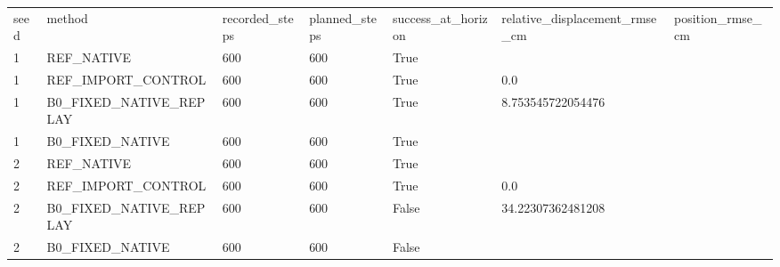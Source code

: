 \begin{tabular}{lllllll}
seed & method & recorded\_steps & planned\_steps & success\_at\_horizon & relative\_displacement\_rmse\_cm & position\_rmse\_cm \\
1 & REF\_NATIVE & 600 & 600 & True &  &  \\
1 & REF\_IMPORT\_CONTROL & 600 & 600 & True & 0.0 &  \\
1 & B0\_FIXED\_NATIVE\_REPLAY & 600 & 600 & True & 8.753545722054476 &  \\
1 & B0\_FIXED\_NATIVE & 600 & 600 & True &  &  \\
2 & REF\_NATIVE & 600 & 600 & True &  &  \\
2 & REF\_IMPORT\_CONTROL & 600 & 600 & True & 0.0 &  \\
2 & B0\_FIXED\_NATIVE\_REPLAY & 600 & 600 & False & 34.22307362481208 &  \\
2 & B0\_FIXED\_NATIVE & 600 & 600 & False &  &  \\
\end{tabular}
